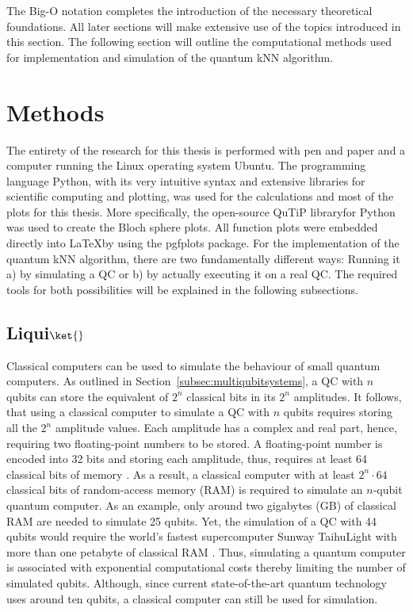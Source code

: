 The Big-O notation completes the introduction of the necessary theoretical foundations. All later sections will make extensive use of the topics introduced in this section. The following section will outline the computational methods used for implementation and simulation of the quantum kNN algorithm.

\chapter{Methods}\label{sec:methods}

The entirety of the research for this thesis is performed with pen and paper and a computer running the Linux operating system Ubuntu. The programming language Python, with its very intuitive syntax and extensive libraries for scientific computing and plotting, was used for the calculations and most of the plots for this thesis. More specifically, the open-source QuTiP library\footnotemark[7] for Python was used to create the Bloch sphere plots. All function plots were embedded directly into \LaTeX  by using the pgfplots package\footnotemark[8]. For the implementation of the quantum kNN algorithm, there are two fundamentally different ways: Running it a) by simulating a QC or b) by actually executing it on a real QC. The required tools for both possibilities will be explained in the following subsections.

\section{Liqui$\ket{}$}
\label{subsec:simulation}

Classical computers can be used to simulate the behaviour of small quantum computers. As outlined in Section~\ref{subsec:multiqubitsystems}, a QC with $n$ qubits can store the equivalent of $2^n$ classical bits in its $2^n$ amplitudes. It follows, that using a classical computer to simulate a QC with $n$ qubits requires storing all the $2^n$ amplitude values. Each amplitude has a complex and real part, hence, requiring two floating-point numbers to be stored. A floating-point number is encoded into 32 bits and storing each amplitude, thus, requires at least 64 classical bits of memory \cite{lambropoulos2007fundamentals}. As a result, a classical computer with at least $2^n\cdot64$ classical bits of random-access memory (RAM) is required to simulate an $n$-qubit quantum computer. As an example, only around two gigabytes (GB) of classical RAM are needed to simulate 25 qubits. Yet, the simulation of a QC with 44 qubits would require the world's fastest supercomputer Sunway TaihuLight with more than one petabyte of classical RAM \cite{chinasupercomputer}. Thus, simulating a quantum computer is associated with exponential computational costs thereby limiting the number of simulated qubits. Although, since current state-of-the-art quantum technology uses around ten qubits, a classical computer can still be used for simulation.

